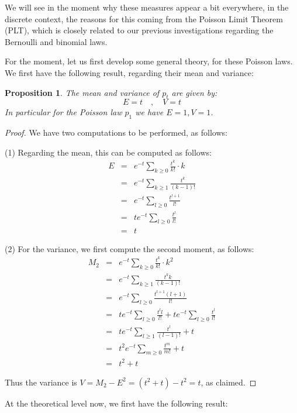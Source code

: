 \documentclass[12pt]{amsbook}
\newtheorem{proposition}[theorem]{Proposition}
\begin{document}
We will see in the moment why these measures appear a bit everywhere, in the discrete context, the reasons for this coming from the Poisson Limit Theorem (PLT), which is closely related to our previous investigations regarding the Bernoulli and binomial laws. 

\bigskip

For the moment, let us first develop some general theory, for these Poisson laws. We first have the following result, regarding their mean and variance:

\begin{proposition}
The mean and variance of $p_t$ are given by:
$$E=t\quad,\quad V=t$$
In particular for the Poisson law $p_1$ we have $E=1,V=1$.
\end{proposition}

\begin{proof}
We have two computations to be performed, as follows:

\medskip

(1) Regarding the mean, this can be computed as follows:
\begin{eqnarray*}
E
&=&e^{-t}\sum_{k\geq0}\frac{t^k}{k!}\cdot k\\
&=&e^{-t}\sum_{k\geq1}\frac{t^k}{(k-1)!}\\
&=&e^{-t}\sum_{l\geq0}\frac{t^{l+1}}{l!}\\
&=&te^{-t}\sum_{l\geq0}\frac{t^l}{l!}\\
&=&t
\end{eqnarray*}

(2) For the variance, we first compute the second moment, as follows:
\begin{eqnarray*}
M_2
&=&e^{-t}\sum_{k\geq0}\frac{t^k}{k!}\cdot k^2\\
&=&e^{-t}\sum_{k\geq1}\frac{t^kk}{(k-1)!}\\
&=&e^{-t}\sum_{l\geq0}\frac{t^{l+1}(l+1)}{l!}\\
&=&te^{-t}\sum_{l\geq0}\frac{t^ll}{l!}+te^{-t}\sum_{l\geq0}\frac{t^l}{l!}\\
&=&te^{-t}\sum_{l\geq1}\frac{t^l}{(l-1)!}+t\\
&=&t^2e^{-t}\sum_{m\geq0}\frac{t^m}{m!}+t\\
&=&t^2+t
\end{eqnarray*}

Thus the variance is $V=M_2-E^2=(t^2+t)-t^2=t$, as claimed.
\end{proof}

At the theoretical level now, we first have the following result:
\end{document}
